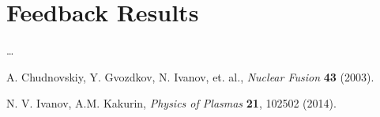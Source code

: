 \documentclass{article}
\begin{document}
\section{Feedback Results}
\ldots



\begin{thebibliography}{}

A. Chudnovskiy, Y. Gvozdkov, N. Ivanov, et. al.,
\emph{Nuclear Fusion}
{\bf 43} (2003). 

N. V. Ivanov, A.M. Kakurin,
\emph{Physics of Plasmas}
{\bf 21}, 102502 (2014). 


\end{thebibliography}

\end{document}
